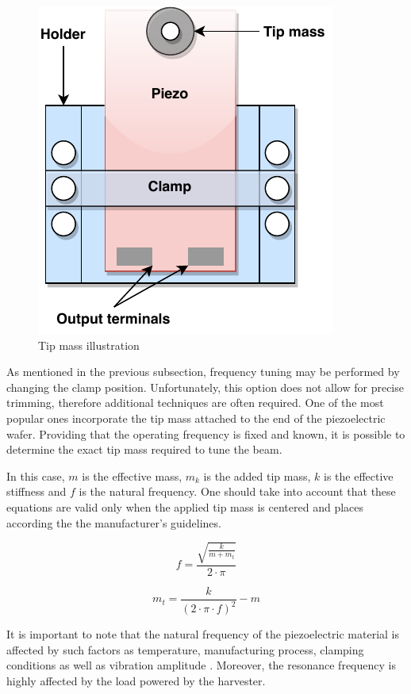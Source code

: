 \documentclass[12pt,a4paper]{article}
\begin{document}
\begin{figure}[ht!]
\includegraphics[scale=0.85]{tipmass.pdf}
\caption{Tip mass illustration}
\label{fig:tipmass}
\end{figure}

As mentioned in the previous subsection, frequency tuning may be performed by changing the clamp position. Unfortunately, this option does not allow for precise trimming, therefore additional techniques are often required. One of the most popular ones incorporate the tip mass attached to the end of the piezoelectric wafer. Providing that the operating frequency is fixed and known, it is possible to determine the exact tip mass required to tune the beam.
\par

In this case, $m$ is the effective mass, $m_k$ is the added tip mass, $k$ is the effective stiffness and $f$ is the natural frequency. One should take into account that these equations are valid only when the applied tip mass is centered and places according the the manufacturer's guidelines.

\begin{equation}
    f = \frac{\sqrt{\frac{k}{m + m_{t}}}}{2\cdot\pi}
    \label{resonant1}
\end{equation}

\begin{equation}
    m_{t} = \frac{k}{(2\cdot\pi\cdot f)^2} - m
    \label{resonant2}
\end{equation}

It is important to note that the natural frequency of the piezoelectric material is affected by such factors as temperature, manufacturing process, clamping conditions as well as vibration amplitude \cite{PPA}. Moreover, the resonance frequency is highly affected by the load powered by the harvester. 
\par
\end{document}
